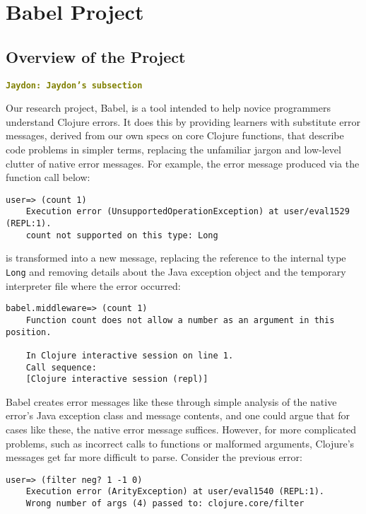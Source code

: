 \documentclass[12pt]{article}
\newcommand{\comment}[1]{{\bf \tt  {#1}}}
\newcommand{\jscomment}[1]{\textcolor{olive}{\comment{Jaydon: {#1}}}}
\begin{document}
\section{Babel Project}\label{sec:babel}
\subsection{Overview of the Project}\label{subsec:overview}
\jscomment{Jaydon's subsection}

Our research project, Babel, is a tool intended to help novice programmers understand Clojure errors. It does this by providing learners with substitute error messages, derived from our own specs on core Clojure functions, that describe code problems in simpler terms, replacing the unfamiliar jargon and low-level clutter of native error messages. For example, the error message produced via the function call below:

\begin{lstlisting}[breaklines=true, basicstyle=\ttfamily]
    user=> (count 1)
    Execution error (UnsupportedOperationException) at user/eval1529 (REPL:1).
    count not supported on this type: Long
\end{lstlisting}
    
is transformed into a new message, replacing the reference to the internal type \verb|Long| and removing details about the Java exception object and the temporary interpreter file where the error occurred:

\begin{lstlisting}[breaklines=true, basicstyle=\ttfamily]
    babel.middleware=> (count 1)
    Function count does not allow a number as an argument in this position.

    In Clojure interactive session on line 1.
    Call sequence:
    [Clojure interactive session (repl)]
\end{lstlisting}

Babel creates error messages like these through simple analysis of the native error's Java exception class and message contents, and one could argue that for cases like these, the native error message suffices. However, for more complicated problems, such as incorrect calls to functions or malformed arguments, Clojure's messages get far more difficult to parse. Consider the previous error:

\begin{lstlisting}[breaklines=true, basicstyle=\ttfamily]
    user=> (filter neg? 1 -1 0)
    Execution error (ArityException) at user/eval1540 (REPL:1).
    Wrong number of args (4) passed to: clojure.core/filter
\end{lstlisting}
\end{document}

